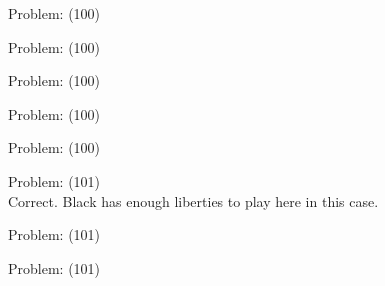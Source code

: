 \documentclass[11pt]{article}
\begin{document}
\begin{minipage}[t]{0.5\textwidth}
  {\centering
  
  Problem: (100)\\
  
  }
\end{minipage}
\begin{minipage}[t]{0.5\textwidth}
  {\centering
  
  Problem: (100)\\
  
  }
\end{minipage}
\begin{minipage}[t]{0.5\textwidth}
  {\centering
  
  Problem: (100)\\
  
  }
\end{minipage}
\begin{minipage}[t]{0.5\textwidth}
  {\centering
  
  Problem: (100)\\
  
  }
\end{minipage}
\begin{minipage}[t]{0.5\textwidth}
  {\centering
  
  Problem: (100)\\
  
  }
\end{minipage}
\begin{minipage}[t]{0.5\textwidth}
  {\centering
  
  Problem: (101)\\
  Correct. Black has enough liberties to play here in this case.\\
  }
\end{minipage}
\begin{minipage}[t]{0.5\textwidth}
  {\centering
  
  Problem: (101)\\
  
  }
\end{minipage}
\begin{minipage}[t]{0.5\textwidth}
  {\centering
  
  Problem: (101)\\
  
  }
\end{minipage}
\end{document}
